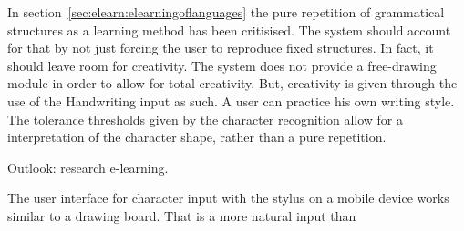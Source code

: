 In section~\ref{sec:elearn:elearningoflanguages} the pure repetition of 
grammatical structures as a learning method has been critisised.
The system should account for that by not just forcing the user to
reproduce fixed structures. In fact, it should leave room for creativity.
The system does not provide a free-drawing module in order to allow for
total creativity. But, creativity is given through the use of the
Handwriting input as such. A user can practice his own writing style.
The tolerance thresholds given by the character recognition allow for a
interpretation of the character shape, rather than a pure repetition.



Outlook:
research e-learning.


The user interface for character input with the stylus on a mobile device
works similar to a drawing board. That is a more natural input than
